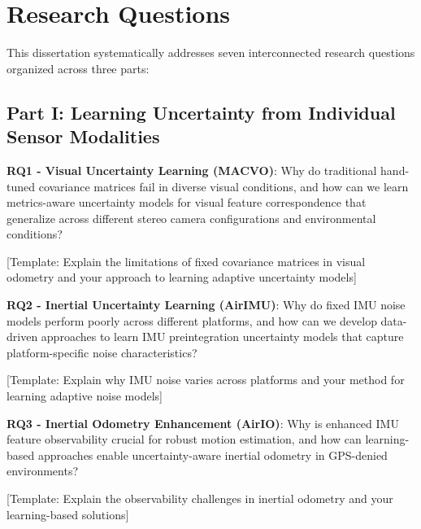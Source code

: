 \section{Research Questions}
\label{sec:research_questions}

This dissertation systematically addresses seven interconnected research questions organized across three parts:

\subsection{Part I: Learning Uncertainty from Individual Sensor Modalities}

\begin{framed}
\textbf{RQ1 - Visual Uncertainty Learning (MACVO)}: Why do traditional hand-tuned covariance matrices fail in diverse visual conditions, and how can we learn metrics-aware uncertainty models for visual feature correspondence that generalize across different stereo camera configurations and environmental conditions?
\end{framed}

[Template: Explain the limitations of fixed covariance matrices in visual odometry and your approach to learning adaptive uncertainty models]

\begin{framed}
\textbf{RQ2 - Inertial Uncertainty Learning (AirIMU)}: Why do fixed IMU noise models perform poorly across different platforms, and how can we develop data-driven approaches to learn IMU preintegration uncertainty models that capture platform-specific noise characteristics?
\end{framed}

[Template: Explain why IMU noise varies across platforms and your method for learning adaptive noise models]

\begin{framed}
\textbf{RQ3 - Inertial Odometry Enhancement (AirIO)}: Why is enhanced IMU feature observability crucial for robust motion estimation, and how can learning-based approaches enable uncertainty-aware inertial odometry in GPS-denied environments?
\end{framed}

[Template: Explain the observability challenges in inertial odometry and your learning-based solutions]

